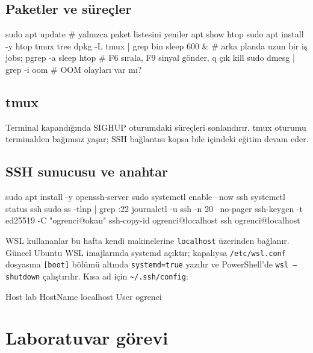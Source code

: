 \documentclass[11pt,a4paper]{article}
\begin{document}
\subsection{Paketler ve süreçler}
\begin{kodblok}
sudo apt update                    # yalnızca paket listesini yeniler
apt show htop
sudo apt install -y htop tmux tree
dpkg -L tmux | grep bin
sleep 600 &                        # arka planda uzun bir iş
jobs; pgrep -a sleep
htop                               # F6 sırala, F9 sinyal gönder, q çık
kill %
sudo dmesg | grep -i oom           # OOM olayları var mı?
\end{kodblok}

\subsection{tmux}
Terminal kapandığında SIGHUP oturumdaki süreçleri sonlandırır. tmux oturumu terminalden bağımsız yaşar; SSH bağlantısı kopsa bile içindeki eğitim devam eder.

\subsection{SSH sunucusu ve anahtar}
\begin{kodblok}
sudo apt install -y openssh-server
sudo systemctl enable --now ssh
systemctl status ssh
sudo ss -tlnp | grep :22
journalctl -u ssh -n 20 --no-pager
ssh-keygen -t ed25519 -C "ogrenci@okan"
ssh-copy-id ogrenci@localhost
ssh ogrenci@localhost
\end{kodblok}
WSL kullananlar bu hafta kendi makinelerine \texttt{localhost} üzerinden bağlanır. Güncel Ubuntu WSL imajlarında systemd açıktır; kapalıysa \texttt{/etc/wsl.conf} dosyasına \texttt{[boot]} bölümü altında \texttt{systemd=true} yazılır ve PowerShell'de \texttt{wsl --shutdown} çalıştırılır. Kısa ad için \texttt{\textasciitilde/.ssh/config}:
\begin{kodblok}
Host lab
    HostName localhost
    User ogrenci
\end{kodblok}

\section{Laboratuvar görevi}
\end{document}
